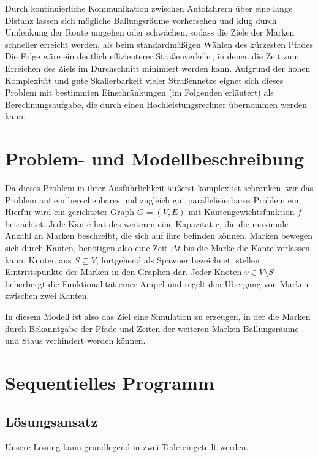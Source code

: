 \documentclass[paper=A4,pagesize=auto,12pt,headinclude=true,footinclude=true,BCOR=0mm,DIV=calc]{scrartcl}
\begin{document}
	Durch kontinuierliche Kommunikation zwischen Autofahrern über eine lange Distanz lassen sich mögliche Ballungsräume vorhersehen und klug durch Umlenkung der Route umgehen oder schwächen, sodass die Ziele der Marken schneller erreicht werden, als beim standardmäßigen Wählen des kürzesten Pfades
	Die Folge wäre ein deutlich effizienterer Straßenverkehr, in denen die Zeit zum Erreichen des Ziels im Durchschnitt minimiert werden kann. Aufgrund der hohen Komplexität und gute Skalierbarkeit vieler Straßennetze eignet sich dieses Problem mit bestimmten Einschränkungen (im Folgenden erläutert) als Berechnungsaufgabe, die durch einen Hochleistungsrechner übernommen werden kann.
	
	\section{Problem- und Modellbeschreibung}
	Da dieses Problem in ihrer Ausführlichkeit äußerst komplex ist schränken, wir das Problem auf ein berechenbares und zugleich gut parallelisierbares Problem ein. 
	Hierfür wird ein gerichteter Graph $G = (V,E)$ mit Kantengewichtsfunktion $f$ betrachtet. Jede Kante hat des weiteren eine Kapazität c, die die maximale Anzahl an Marken beschreibt, die sich auf ihre befinden können. Marken bewegen sich durch Kanten, benötigen also eine Zeit $\Delta t$ bis die Marke die Kante verlassen kann. Knoten aus $S \subseteq V$, fortgehend als Spawner bezeichnet, stellen Eintrittspunkte der Marken in den Graphen dar. Jeder Knoten $v \in V \setminus S$ beherbergt die Funktionalität einer Ampel und regelt den Übergang von Marken zwischen zwei Kanten.
	
	In diesem Modell ist also das Ziel eine Simulation zu erzeugen, in der die Marken durch Bekanntgabe der Pfade und Zeiten der weiteren Marken Ballungsräume und Staus verhindert werden können.
	
	\section{Sequentielles Programm}
	
	\subsection{Lösungsansatz}
	Unsere Lösung kann grundlegend in zwei Teile eingeteilt werden.
	
\end{document}
